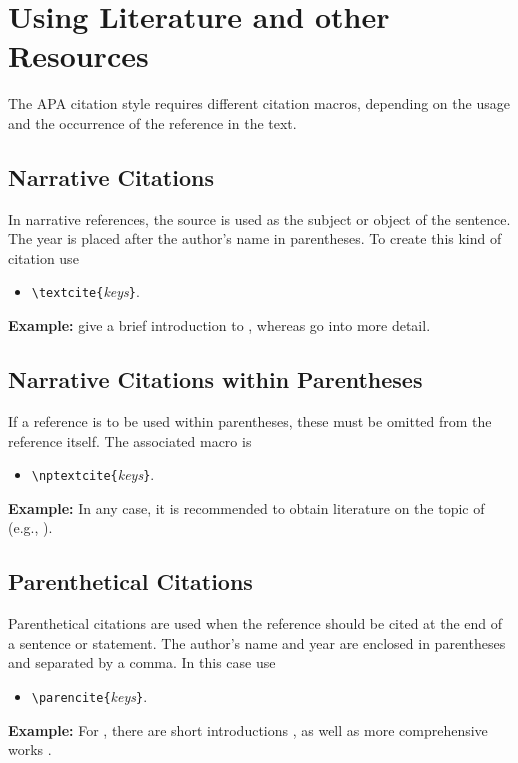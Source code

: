 \chapter[Using Literature]{Using Literature and other Resources}
\label{cha:Literature}

The APA citation style requires different citation macros, depending on the usage and the
occurrence of the reference in the text.

\section{Narrative Citations}

In narrative references, the source is used as the subject or object of the sentence. The
year is placed after the author's name in parentheses. To create this kind of citation use 
%
\begin{itemize}
\item[] \verb!\textcite{!\textit{keys}\verb!}!.
\end{itemize}
%
\textbf{Example:}
\textcite{Daniel2018} give a brief introduction to \latex, whereas \textcite{Oetiker2018, Kopka2003} 
go into more detail.


\section{Narrative Citations within Parentheses}

If a reference is to be used within parentheses, these must be omitted from the reference itself. 
The associated macro is
%
\begin{itemize}
\item[] \verb!\nptextcite{!\textit{keys}\verb!}!.
\end{itemize}
%
\textbf{Example:}
In any case, it is recommended to obtain literature on the topic of \latex (e.g., 
).


\section{Parenthetical Citations}

Parenthetical citations are used when the reference should be cited at the end of a sentence or statement.
The author's name and year are enclosed in parentheses and separated by a comma. In this case use
%
\begin{itemize}
\item[] \verb!\parencite{!\textit{keys}\verb!}!.
\end{itemize}
%
\textbf{Example:}
For \latex, there are short introductions \parencite{Daniel2018}, as well as more comprehensive works 
\parencite{Oetiker2018, Kopka2003}.



